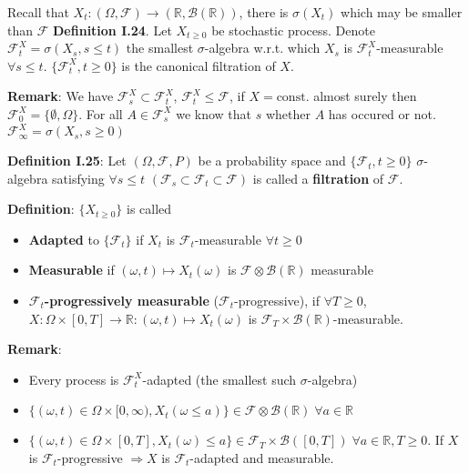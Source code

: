 \documentclass[english]{article}
\newcommand{\R}{\mathbb{R}}
\newcommand{\note}[1]{\noindent\textbf{#1}}
\newcommand{\F}{\mathcal F}
\newcommand{\B}{\mathcal B}
\begin{document}
Recall that $X_t : (\Omega, \F) \to (\R, \mathcal B(\R))$, there is $\sigma(X_t)$ which may be smaller than $\F$ \newline
\note{Definition I.24}. Let $X_{t\geq 0}$ be stochastic process. Denote $\F^X_t = \sigma(X_s, s \leq t)$ the smallest $\sigma$-algebra w.r.t. which $X_s$ is $\F^X_t$-measurable $\forall s\leq t$. $\{\F^X_t, t\geq 0\}$ is the canonical filtration of $X$.\newline

\note{Remark}: We have $\F^X_s \subset \F^X_t$, $\F^X_t \leq \F$, if $X=\text{const}$. almost surely then $\F^X_0=\{\emptyset, \Omega\}$. For all $A\in \F^X_s$ we know that $s$ whether $A$ has occured or not. \newline
$\F^X_\infty = \sigma(X_s, s\geq 0)$ \newline

\note{Definition I.25}: Let $(\Omega, \F, P)$ be a probability space and $\{\F_t, t\geq 0\}$ $\sigma$-algebra satisfying $\forall s\leq t$ $(\F_s \subset \F_t \subset \F)$ is called a \textbf{filtration} of $\F$. \newline

\note{Definition}: $\{X_{t\geq 0}\}$ is called \begin{itemize}
\item[a)] \textbf{Adapted} to $\{\F_t\}$ if $X_t$ is $\F_t$-measurable $\forall t\geq 0$
\item[b)] \textbf{Measurable} if $(\omega, t)\mapsto X_t(\omega)$ is $\F \otimes \B(\R)$ measurable
\item[c)] $\F_t$\textbf{-progressively measurable} ($\F_t$-progressive), if $\forall T\geq 0$, $X: \Omega \times [0,T] \to \R: (\omega, t) \mapsto X_t(\omega)$ is $\F_T\times \B(\R)$-measurable.
\end{itemize}

\note{Remark}: \begin{itemize}
\item[a)] Every process is $\F^X_t$-adapted (the smallest such $\sigma$-algebra)
\item[b)] $\{(\omega, t) \in \Omega \times [0,\infty), X_t(\omega \leq a)\} \in \F\otimes \B(\R)\; \forall a\in \R$
\item[c)] $\{(\omega, t) \in \Omega \times [0, T], X_t(\omega) \leq a\} \in \F_T \times \B([0,T]) \; \forall a\in \R, T\geq 0$. If $X$ is $\F_t$-progressive $\Rightarrow X$ is $\F_t$-adapted and measurable.
\end{itemize}
\end{document}
